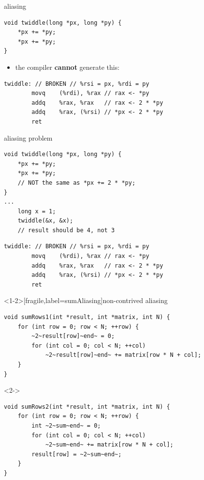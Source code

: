 \begin{frame}[fragile,label=aliasingEx1]{aliasing}
    \lstset{language=C,style=small}
\begin{lstlisting}
void twiddle(long *px, long *py) {
    *px += *py;
    *px += *py;
}
\end{lstlisting}
    \begin{itemize}
        \item the compiler \textbf{cannot} generate this:
    \end{itemize}
    \lstset{language=myasm,style=small}
\begin{lstlisting}
twiddle: // BROKEN // %rsi = px, %rdi = py
        movq    (%rdi), %rax // rax <- *py
        addq    %rax, %rax   // rax <- 2 * *py
        addq    %rax, (%rsi) // *px <- 2 * *py
        ret
\end{lstlisting}
\end{frame}

\begin{frame}[fragile,label=aliasingProb]{aliasing problem}
\lstset{language=C,style=small}
\begin{lstlisting}
void twiddle(long *px, long *py) {
    *px += *py;
    *px += *py;
    // NOT the same as *px += 2 * *py;
}
...
    long x = 1;
    twiddle(&x, &x);
    // result should be 4, not 3
\end{lstlisting}
    \vspace{-.25cm}
\hrulefill
    \lstset{language=myasm,style=small}
\begin{lstlisting}
twiddle: // BROKEN // %rsi = px, %rdi = py
        movq    (%rdi), %rax // rax <- *py
        addq    %rax, %rax   // rax <- 2 * *py
        addq    %rax, (%rsi) // *px <- 2 * *py
        ret
\end{lstlisting}
\end{frame}

\begin{frame}<1-2>[fragile,label=sumAliasing]{non-contrived aliasing}
\begin{lstlisting}
void sumRows1(int *result, int *matrix, int N) {
    for (int row = 0; row < N; ++row) {
        ~2~result[row]~end~ = 0;
        for (int col = 0; col < N; ++col)
            ~2~result[row]~end~ += matrix[row * N + col];
    }
}
\end{lstlisting}
\begin{visibleenv}<2->
\hrulefill
\begin{lstlisting}
void sumRows2(int *result, int *matrix, int N) {
    for (int row = 0; row < N; ++row) {
        int ~2~sum~end~ = 0;
        for (int col = 0; col < N; ++col)
            ~2~sum~end~ += matrix[row * N + col];
        result[row] = ~2~sum~end~;
    }
}
\end{lstlisting}
\end{visibleenv}
\end{frame}

